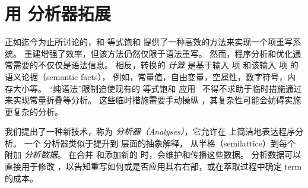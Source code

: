 \section{用 \eclass 分析器拓展 \Egraphs}
\label{sec:extensions}

正如迄今为止所讨论的，\egraphs 和 等式饱和 提供了一种高效的方法来实现一个项重写系统。
重建增强了效率，但该方法仍然仅限于语法重写。
然而，程序分析和优化通常需要的不仅仅是语法信息。
相反，转换的 \emph{计算} 是基于输入 项 和该输入 项 的语义论据（semantic facts），
  例如，常量值，自由变量，空属性，数字符号，内存大小等。
“纯语法”限制迫使现有的 等式饱和 应用~\cite{eqsat, eqsat-llvm, herbie} 
  不得不求助于临时措施通过 \egraph 来实现常量折叠等分析。
这些临时措施需要手动操纵 \egraph ，其复杂性可能会妨碍实施更复杂的分析。


我们提出了一种新技术，称为 \textit{\eclass 分析器（\eclass Analyses）}，它允许在 \egraph 上简洁地表达程序分析。
一个 \eclass 分析器类似于提升到 \egraph 层面的抽象解释，
  从半格（semilattice）到每个\eclass 附加 \textit{分析数据}。%
在合并 \eclasses 和添加新的 \enodes 时，\egraph 会维护和传播这些数据。
分析数据可以直接用于修改 \egraph，以告知重写如何或是否应用其右右部，或在萃取过程中确定 term 的成本。

